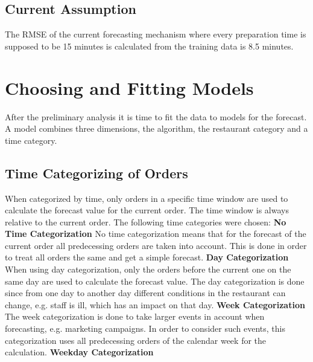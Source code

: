 \subsection{Current Assumption}
The RMSE of the current forecasting mechanism where every preparation time is supposed to be 15 minutes is calculated from the training data is 8.5 minutes.
\section{Choosing and Fitting Models}\label{Choosing and Fitting Models}
After the preliminary analysis it is time to fit the data to models for the forecast. A model combines three dimensions, the algorithm, the restaurant category and a time category.
\subsection{Time Categorizing of Orders}\label{subsection:Categorizing by Order}
When categorized by time, only orders in a specific time window are used to calculate the forecast value for the current order. The time window is always relative to the current order. The following time categories were chosen:
\newline\newline\textbf{No Time Categorization}\newline
No time categorization means that for the forecast of the current order all predecessing orders are taken into account. This is done in order to treat all orders the same and get a simple forecast.
\newline\newline\textbf{Day Categorization}\newline
When using day categorization, only the orders before the current one on the same day are used to calculate the forecast value. The day categorization is done since from one day to another day different conditions in the restaurant can change, e.g. staff is ill, which has an impact on that day.
\newline\newline\textbf{Week Categorization}\newline
The week categorization is done to take larger events in account when forecasting, e.g. marketing campaigns. In order to consider such events, this categorization uses all predecessing orders of the calendar week for the calculation.
\newline\newline\textbf{Weekday Categorization}\newline
